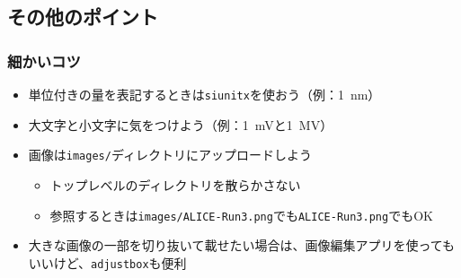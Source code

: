 \documentclass[dvipdfmx,12pt,aspectratio=169]{beamer}
\begin{document}
\subsection{その他のポイント}
\begin{frame}\frametitle{細かいコツ}
\begin{itemize}
    \item 単位付きの量を表記するときは\texttt{siunitx}を使おう（例：\SI{1}{nm}）
    \item 大文字と小文字に気をつけよう（例：\SI{1}{mV}と\SI{1}{MV}）
    \item 画像は\texttt{images/}ディレクトリにアップロードしよう \begin{itemize}
        \item トップレベルのディレクトリを散らかさない
        \item 参照するときは\texttt{images/ALICE-Run3.png}でも\texttt{ALICE-Run3.png}でもOK
    \end{itemize}
    \item 大きな画像の一部を切り抜いて載せたい場合は、画像編集アプリを使ってもいいけど、\texttt{adjustbox}も便利
\end{itemize}
\end{frame}
\end{document}
